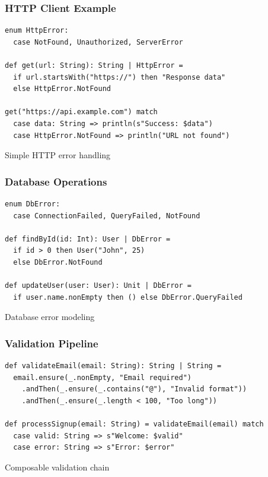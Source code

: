 \documentclass{beamer}
\begin{document}
\begin{frame}[fragile]
\frametitle{HTTP Client Example}

\begin{lstlisting}[style=scalaStyle]
enum HttpError:
  case NotFound, Unauthorized, ServerError

def get(url: String): String | HttpError =
  if url.startsWith("https://") then "Response data"
  else HttpError.NotFound

get("https://api.example.com") match
  case data: String => println(s"Success: $data")
  case HttpError.NotFound => println("URL not found")
\end{lstlisting}

Simple HTTP error handling

\end{frame}

\begin{frame}[fragile]
\frametitle{Database Operations}

\begin{lstlisting}[style=scalaStyle]
enum DbError:
  case ConnectionFailed, QueryFailed, NotFound

def findById(id: Int): User | DbError =
  if id > 0 then User("John", 25)
  else DbError.NotFound

def updateUser(user: User): Unit | DbError =
  if user.name.nonEmpty then () else DbError.QueryFailed
\end{lstlisting}

Database error modeling

\end{frame}

\begin{frame}[fragile]
\frametitle{Validation Pipeline}

\begin{lstlisting}[style=scalaStyle]
def validateEmail(email: String): String | String =
  email.ensure(_.nonEmpty, "Email required")
    .andThen(_.ensure(_.contains("@"), "Invalid format"))
    .andThen(_.ensure(_.length < 100, "Too long"))

def processSignup(email: String) = validateEmail(email) match
  case valid: String => s"Welcome: $valid"
  case error: String => s"Error: $error"
\end{lstlisting}

Composable validation chain

\end{frame}
\end{document}

